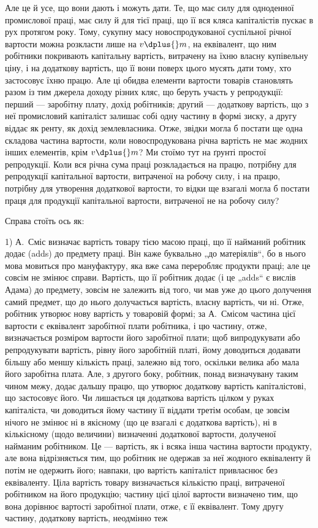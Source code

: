 \parcont{}  %
Але це й усе, що вони дають і можуть дати. Те, що має силу для одноденної промислової праці, має
силу й для тієї праці, що її вся кляса капіталістів пускає в рух протягом року. Тому, сукупну масу
новоспродукованої суспільної річної вартости можна розкласти лише на $v \dplus{} m$, на еквівалент, що ним
робітники покривають капітальну вартість, витрачену на їхню власну купівельну ціну, і на додаткову
вартість, що її вони поверх цього мусять дати тому, хто застосовує їхню працю. Але ці обидва
елементи вартости товарів становлять разом із тим джерела доходу різних кляс, що беруть участь у
репродукції: перший — заробітну плату, дохід робітників; другий — додаткову вартість, що з неї
промисловий капіталіст залишає собі одну частину в формі зиску, а другу віддає як ренту, як дохід
землевласника. Отже, звідки могла б постати ще одна складова частина вартости, коли новоспродукована
річна вартість не має жодних інших елементів, крім $v \dplus{} m$? Ми стоїмо тут на ґрунті простої
репродукції. Коли вся річна сума праці розкладається на працю, потрібну для репродукції капітальної
вартости, витраченої на робочу силу, і на працю, потрібну для утворення додаткової вартости, то
відки ще взагалі могла б постати праця для продукції капітальної вартости, витраченої не на робочу
силу?

Справа стоїть ось як:

1) А.~Сміс визначає вартість товару тією масою праці, що її найманий робітник додає (adds) до
предмету праці. Він каже буквально „до матеріялів“, бо в нього мова мовиться про мануфактуру, яка
вже сама переробляє продукти праці; але це совсім не змінює справи. Вартість, що її робітник додає
(і це „adds“ є вислів Адама) до предмету, зовсім
не залежить від того, чи мав уже до цього долучення самий предмет, що до нього долучається вартість,
власну вартість, чи ні. Отже, робітник утворює нову вартість у товаровій формі; за А.~Смісом частина
цієї вартости є еквівалент заробітної плати робітника, і цю частину, отже, визначається розміром
вартости його заробітної плати; щоб випродукувати або репродукувати вартість, рівну його заробітній
платі, йому
доводиться додавати більшу або меншу кількість праці, залежно від того, оскільки велика або мала
його заробітна плата. Але, з другого боку, робітник, понад визначувану таким чином межу, додає
дальшу працю, що утворює додаткову вартість капіталістові, що застосовує його. Чи лишається ця
додаткова вартість цілком у руках капіталіста, чи доводиться йому частину її віддати третім особам,
це зовсім нічого не змінює ні в якісному (що це взагалі є додаткова вартість), ні в кількісному
(щодо величини) визначенні додаткової вартости, долученої найманим робітником. Це — вартість, як і
всяка інша частина вартости продукту, але вона відрізняється тим, що робітник не одержав за неї
жодного еквіваленту й потім не одержить його; навпаки, цю вартість капіталіст привласнює без
еквіваленту. Ціла вартість товару визначається кількістю
праці, витраченої робітником на його продукцію; частину цієї цілої вартости визначено тим, що вона
дорівнює вартості заробітної плати, отже, є її еквівалент. Тому другу частину, додаткову вартість,
неодмінно теж
\parbreak{}  %
